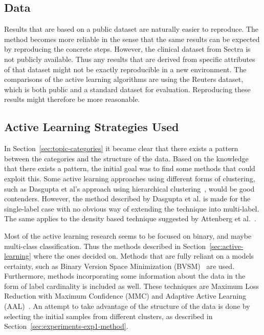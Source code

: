 \subsection{Data}

Results that are based on a public dataset are naturally easier to reproduce.
The method becomes more reliable in the sense that the same results can be expected by reproducing the concrete steps.
However, the clinical dataset from Sectra is not publicly available.
Thus any results that are derived from specific attributes of that dataset might not be exactly reproducible in a new environment.
The comparisons of the active learning algorithms are using the Reuters dataset, which is both public and a standard dataset for evaluation.
Reproducing these results might therefore be more reasonable.

\subsection{Active Learning Strategies Used}

In Section~\ref{sec:topic-categories} it became clear that there exists a pattern between the categories and the structure of the data.
Based on the knowledge that there exists a pattern, the initial goal was to find some methods that could exploit this.
Some active learning approaches using different forms of clustering, such as Dasgupta et al\@'s approach using hierarchical clustering~\cite{dasgupta2008hierarchical}, would be good contenders.
However, the method described by Dasgupta et al\@. is made for the single-label case with no obvious way of extending the technique into multi-label.
The same applies to the density based technique suggested by Attenberg et al\@.~\cite{attenberg2013class}.

Most of the active learning research seems to be focused on binary, and maybe multi-class classification.
Thus the methods described in Section~\ref{sec:active-learning} where the ones decided on.
Methods that are fully reliant on a models certainty, such as Binary Version Space Minimization (BVSM)~\cite{brinker2006active} are used.
Furthermore, methods incorporating some information about the data in the form of label cardinality is included as well.
These techniques are Maximum Loss Reduction with Maximum Confidence (MMC) and Adaptive Active Learning (AAL)~\cite{yang2009effective, li2013active}.
An attempt to take advantage of the structure of the data is done by selecting the initial samples from different clusters, as described in Section~\ref{sec:experiments-exp1-method}.

